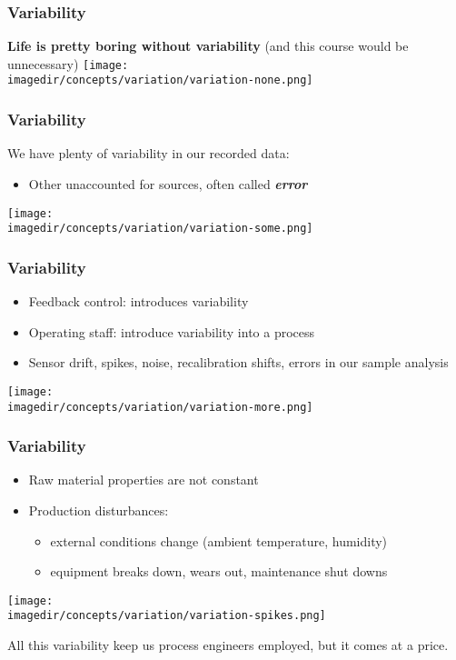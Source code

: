 \begin{frame}\frametitle{Variability}
	\textbf{Life is pretty boring without variability} (and this course would be unnecessary)
	\texttt{[image: \\imagedir/concepts/variation/variation-none.png]}
\end{frame}

\begin{frame}\frametitle{Variability}
	We have plenty of variability in our recorded data:
	\begin{itemize}
		\item	Other unaccounted for sources, often called \textbf{\emph{error}}
	\end{itemize}
	\texttt{[image: \\imagedir/concepts/variation/variation-some.png]}
\end{frame}

\begin{frame}\frametitle{Variability}
	\begin{itemize}
		\item	Feedback control: introduces variability
		\item	Operating staff: introduce variability into a process
		\item	Sensor drift, spikes, noise, recalibration shifts, errors in our sample analysis
	\end{itemize}

	\texttt{[image: \\imagedir/concepts/variation/variation-more.png]}
\end{frame}

\begin{frame}\frametitle{Variability}
	\begin{itemize}
		\item	Raw material properties are not constant
		\item	Production disturbances:
		\begin{itemize}
			\item	external conditions change (ambient temperature, humidity)
			\item	equipment breaks down, wears out, maintenance shut downs
		\end{itemize}
	\end{itemize}

	\texttt{[image: \\imagedir/concepts/variation/variation-spikes.png]}

	All this variability keep us process engineers employed, but it comes at a price.
\end{frame}

